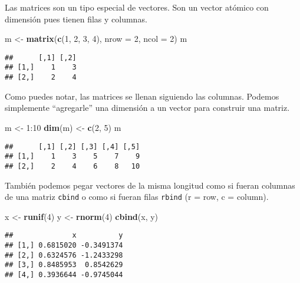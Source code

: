 \documentclass[]{article}
\newenvironment{Shaded}{\begin{snugshade}}{\end{snugshade}}
\newcommand{\KeywordTok}[1]{\textcolor[rgb]{0.13,0.29,0.53}{\textbf{{#1}}}}
\newcommand{\DataTypeTok}[1]{\textcolor[rgb]{0.13,0.29,0.53}{{#1}}}
\newcommand{\DecValTok}[1]{\textcolor[rgb]{0.00,0.00,0.81}{{#1}}}
\newcommand{\StringTok}[1]{\textcolor[rgb]{0.31,0.60,0.02}{{#1}}}
\newcommand{\NormalTok}[1]{{#1}}
\begin{document}
Las matrices son un tipo especial de vectores. Son un vector atómico con
dimensión pues tienen filas y columnas.

\begin{Shaded}
\begin{Highlighting}[]
\NormalTok{m <-}\StringTok{ }\KeywordTok{matrix}\NormalTok{(}\KeywordTok{c}\NormalTok{(}\DecValTok{1}\NormalTok{, }\DecValTok{2}\NormalTok{, }\DecValTok{3}\NormalTok{, }\DecValTok{4}\NormalTok{), }\DataTypeTok{nrow =} \DecValTok{2}\NormalTok{, }\DataTypeTok{ncol =} \DecValTok{2}\NormalTok{)}
\NormalTok{m}
\end{Highlighting}
\end{Shaded}

\begin{verbatim}
##      [,1] [,2]
## [1,]    1    3
## [2,]    2    4
\end{verbatim}

Como puedes notar, las matrices se llenan siguiendo las columnas.
Podemos simplemente ``agregarle'' una dimensión a un vector para
construir una matriz.

\begin{Shaded}
\begin{Highlighting}[]
\NormalTok{m <-}\StringTok{ }\DecValTok{1}\NormalTok{:}\DecValTok{10}
\KeywordTok{dim}\NormalTok{(m) <-}\StringTok{ }\KeywordTok{c}\NormalTok{(}\DecValTok{2}\NormalTok{, }\DecValTok{5}\NormalTok{)}
\NormalTok{m}
\end{Highlighting}
\end{Shaded}

\begin{verbatim}
##      [,1] [,2] [,3] [,4] [,5]
## [1,]    1    3    5    7    9
## [2,]    2    4    6    8   10
\end{verbatim}

También podemos pegar vectores de la misma longitud como si fueran
columnas de una matriz \texttt{cbind} o como si fueran filas
\texttt{rbind} (r = row, c = column).

\begin{Shaded}
\begin{Highlighting}[]
\NormalTok{x <-}\StringTok{ }\KeywordTok{runif}\NormalTok{(}\DecValTok{4}\NormalTok{)}
\NormalTok{y <-}\StringTok{ }\KeywordTok{rnorm}\NormalTok{(}\DecValTok{4}\NormalTok{)}
\KeywordTok{cbind}\NormalTok{(x, y)}
\end{Highlighting}
\end{Shaded}

\begin{verbatim}
##              x          y
## [1,] 0.6815020 -0.3491374
## [2,] 0.6324576 -1.2433298
## [3,] 0.8485953  0.8542629
## [4,] 0.3936644 -0.9745044
\end{verbatim}
\end{document}
